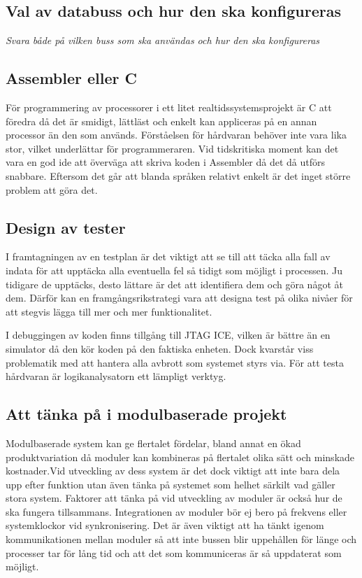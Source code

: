 \documentclass[11pt]{article}
\begin{document}
\begin{flushleft}
\subsection{Val av databuss och hur den ska konfigureras}
\textit{Svara både på vilken buss som ska användas och hur den ska konfigureras}

\subsection{Assembler eller C}

För programmering av processorer i ett litet realtidssystemsprojekt är C att föredra då det är smidigt, lättläst och enkelt kan appliceras på en annan processor än den som används. Förståelsen för hårdvaran behöver inte vara lika stor, vilket underlättar för programmeraren. Vid tidskritiska moment kan det vara en god ide att överväga att skriva koden i Assembler då det då utförs snabbare. Eftersom det går att blanda språken relativt enkelt är det inget större problem att göra det.

\subsection{Design av tester}
I framtagningen av en testplan är det viktigt att se till att täcka alla fall av indata för att upptäcka alla eventuella fel så tidigt som möjligt i processen. Ju tidigare de upptäcks, desto lättare är det att identifiera dem och göra något åt dem. Därför kan en framgångsrikstrategi vara att designa test på olika nivåer för att stegvis lägga till mer och mer funktionalitet.

I debuggingen av koden finns tillgång till JTAG ICE, vilken är bättre än en simulator då den kör koden på den faktiska enheten. Dock kvarstår viss problematik med att hantera alla avbrott som systemet styrs via. För att testa hårdvaran är logikanalysatorn ett lämpligt verktyg.

\subsection{Att tänka på i modulbaserade projekt}


Modulbaserade system  kan ge flertalet fördelar, bland annat en ökad produktvariation då moduler kan kombineras på flertalet olika sätt och minskade kostnader.Vid utveckling av dess system är det dock viktigt att inte bara dela upp efter funktion utan även tänka på systemet som helhet särkilt vad gäller stora system. Faktorer att tänka på vid utveckling av moduler är också hur de ska fungera tillsammans. Integrationen av moduler bör ej bero på frekvens eller systemklockor vid synkronisering. Det är även viktigt att ha tänkt igenom kommunikationen mellan moduler så att inte bussen blir uppehållen för länge och processer tar för lång tid och att det som kommuniceras är så uppdaterat som möjligt.



\pagebreak
{}




\end{flushleft}
\end{document}
